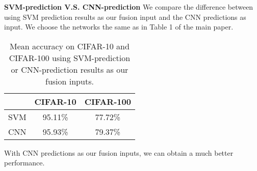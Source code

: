 \documentclass[letterpaper]{article} %
\begin{document}
{\bf{SVM-prediction V.S. CNN-prediction}}
We compare the difference between using SVM prediction results as our fusion input and the CNN predictions as input.
We choose the networks the same as in Table 1 of the main paper.

\begin{table}[ht]
\centering
\begin{tabular}{|c|c|c|}\hline
           &   CIFAR-10 & CIFAR-100      \\\hline
SVM        &   95.11\%  & 77.72\%    \\\hline
CNN        &   95.93\%  & 79.37\% \\\hline
\end{tabular}
\caption{Mean accuracy on CIFAR-10 and CIFAR-100 using SVM-prediction or CNN-prediction results as our fusion inputs.
}
\label{table:state_of_the_art}
\end{table}

With CNN predictions as our fusion inputs, we can obtain a much better performance.
\end{document}
